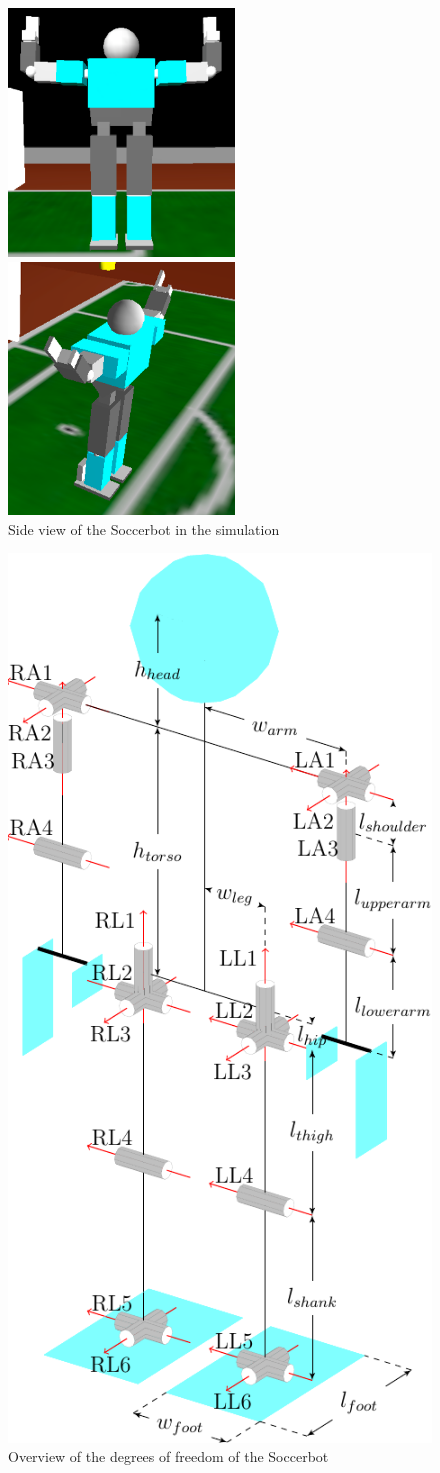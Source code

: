 \begin{figure}[htp]
\begin{minipage}[b]{0.5\linewidth} 
\centering
\includegraphics[width=6cm]{fig/soccerbotfront}
\caption{Frontal view of the Soccerbot in the simulation}
\end{minipage}
\hspace{0.5cm}
\begin{minipage}[b]{0.5\linewidth}
\centering
\includegraphics[width=6cm]{fig/soccerbotside}
\caption{Side view of the Soccerbot in the simulation}
\end{minipage}
\end{figure}

\begin{figure}[htp]
  \centering
  \includegraphics[height=0.6\textwidth]{fig/soccerbot056}
  \caption{Overview of the degrees of freedom of the Soccerbot}
  \label{fig:soccerbotdof}
\end{figure}

